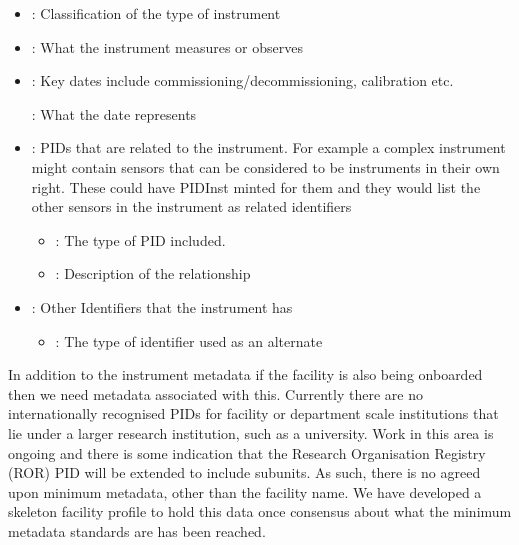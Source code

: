 \documentclass[letterpaper,10pt,english]{sphinxmanual}
\begin{document}
\begin{description}
\begin{itemize}
\item {}
\sphinxAtStartPar
{}: Classification of the type of instrument

\item {}
\sphinxAtStartPar
{}: What the instrument measures or observes

\item {}
\sphinxAtStartPar
{}: Key dates include commissioning/decommissioning, calibration etc.

\sphinxAtStartPar
\sphinxhyphen{}: What the date represents

\item {}
\sphinxAtStartPar
{}: PIDs that are related to the instrument. For example a complex instrument might contain sensors that can be considered to be instruments in their own right. These could have PIDInst minted for them and they would list the other sensors in the instrument as related identifiers
\begin{itemize}
\item {}
\sphinxAtStartPar
{}: The type of PID included.

\item {}
\sphinxAtStartPar
{}: Description of the relationship

\end{itemize}

\item {}
\sphinxAtStartPar
{}: Other Identifiers that the instrument has
\begin{itemize}
\item {}
\sphinxAtStartPar
{}: The type of identifier used as an alternate

\end{itemize}

\end{itemize}

\end{description}

\sphinxAtStartPar
In addition to the instrument metadata if the facility is also being onboarded then we need metadata associated with this. Currently there are no internationally recognised PIDs for facility or department scale institutions that lie under a larger research institution, such as a university. Work in this area is ongoing and there is some indication that the Research Organisation Registry (ROR) PID will be extended to include sub\sphinxhyphen{}units. As such, there is no agreed upon minimum metadata, other than the facility name. We have developed a skeleton facility profile to hold this data once consensus about what the minimum metadata standards are has been reached.
\end{document}
